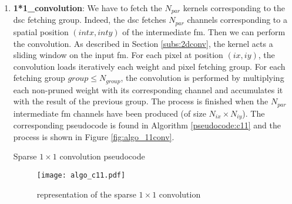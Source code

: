 \begin{enumerate}
    \item \textbf{1*1\_convolution}: We have to fetch the $N_{par}$ kernels corresponding to the \acrshort{dsc} fetching group. Indeed, the \acrshort{dsc} fetches $N_{par}$ channels corresponding to a spatial position $(intx, inty)$ of the intermediate \acrshort{fm}. Then we can perform the convolution. As described in Section \ref{subs:2dconv}, the kernel acts a sliding window on the input \acrshort{fm}. For each pixel at position $(ix, iy)$, the convolution loads iteratively each weight and pixel fetching group. For each fetching group $group \leq N_{group}$, the convolution is performed by multiplying each non-pruned weight with its corresponding channel and accumulates it with the result of the previous group. The process is finished when the $N_{par}$ intermediate \acrshort{fm} channels have been produced (of size $N_{ix} \times N_{iy}$). The corresponding pseudocode is found in Algorithm \ref{pseudocode:c11} and the process is shown in Figure \ref{fig:algo_11conv}.
    \begin{algorithm}[H]
        \centering
        \begin{algorithmic}
             
                 
                     
                         
                             
                            \EndFor
                        \EndFor
                    \EndFor
                \EndFor
            \EndFor
        \end{algorithmic}
        \caption{Sparse $1 \times 1$ convolution pseudocode}
        \label{pseudocode:c11}
    \end{algorithm}
    \begin{figure}[H]
        \centering
        \texttt{[image: algo\_c11.pdf]}
        \caption{representation of the sparse $1 \times 1$ convolution}

\end{figure}
\end{enumerate}
